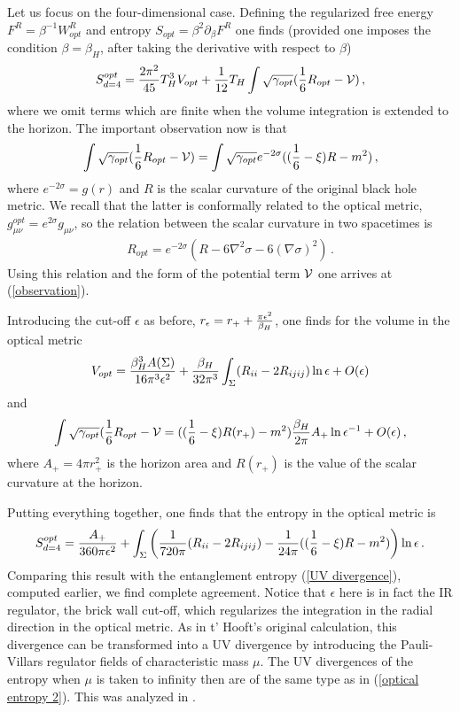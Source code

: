 \documentclass[12pt]{article}
\def\be{\begin{eqnarray}}
\def\ee{\end{eqnarray}}
\def\lb{\label}
\def\o{\over}
\begin{document}
 Let us focus on the four-dimensional case. Defining the regularized free energy  $F^R=\beta^{-1}W^R_{opt}$ and entropy $S_{opt}=\beta^2\partial_\beta F^R$
 one finds (provided one  imposes the condition  $\beta=\beta_H$, after taking the derivative with respect to $\beta$)
 \be
 S^{opt}_{d=4}={2\pi^2\o 45}T^3_HV_{opt}+{1\o 12}T_H\int\sqrt{\gamma_{opt}}({1\o 6}R_{opt}-{\cal V})\, ,
 \lb{optical entropy}
 \ee
where we omit terms which are finite when the volume integration is extended to the horizon. The important observation now is that
\be
\int\sqrt{\gamma_{opt}}({1\o 6}R_{opt}-{\cal V})=\int\sqrt{\gamma_{opt}}e^{-2\sigma}(({1\o 6}-\xi)R-m^2)\, ,
\lb{observation}
\ee
where $e^{-2\sigma}=g(r)$ and $R$ is the scalar curvature of the original black hole metric. We recall that the latter is conformally related to the optical metric,
$g^{opt}_{\mu\nu}=e^{2\sigma}g_{\mu\nu}$,  so the relation between the scalar curvature in two spacetimes is
\be
R_{opt}=e^{-2\sigma}(R-6\nabla^2\sigma-6(\nabla\sigma)^2)\, .
\lb{conformal transfo curvature}
\ee
Using this relation and the form of the potential term $\cal V$ one arrives at (\ref{observation}).


Introducing the cut-off $\epsilon$ as before, $r_\epsilon=r_++{\pi\epsilon^2\o \beta_H}$,
one finds for the volume in the optical metric
\be
V_{opt}={\beta^3_H A(\Sigma)\o 16\pi^3\epsilon^2}+{\beta_H\o 32\pi^3}\int_\Sigma (R_{ii}-2R_{ijij})\ln\epsilon +O(\epsilon)
\lb{optical volume}
\ee
 and
 \be
  \int\sqrt{\gamma_{opt}}({1\o 6}R_{opt}-{\cal V}=(({1\o 6}-\xi)R(r_+)-m^2){\beta_H\o 2\pi}A_+\ln\epsilon^{-1}+O(\epsilon)\, ,
  \lb{a1 term}
  \ee
 where $A_+=4\pi r^2_+$ is the horizon area and $R(r_+)$ is the value of the scalar curvature at the horizon.
 
Putting everything together, one finds that the entropy in the optical metric 
 is
 \be
 S^{opt}_{d=4}={A_+\o  360\pi\epsilon^2}+\int_\Sigma\left({1\o 720\pi}(R_{ii}-2R_{ijij})-{1\o 24\pi}(({1\o 6}-\xi) R-m^2)\right)\ln\epsilon\, .
 \lb{optical entropy 2}
 \ee
 Comparing this result with the entanglement entropy (\ref{UV divergence}), computed earlier, we find  complete agreement.
Notice that $\epsilon$ here is  in fact the  IR regulator, the brick wall cut-off, which  regularizes the integration in the radial direction in the 
optical metric. As in t' Hooft's original calculation, this divergence can be transformed into a UV divergence by introducing the Pauli-Villars regulator fields of characteristic mass $\mu$.
The UV divergences of the entropy when $\mu$ is taken to infinity then are of the same type as in  (\ref{optical entropy 2}). This was analyzed in \cite{Fursaev:1997th}. 
\end{document}
